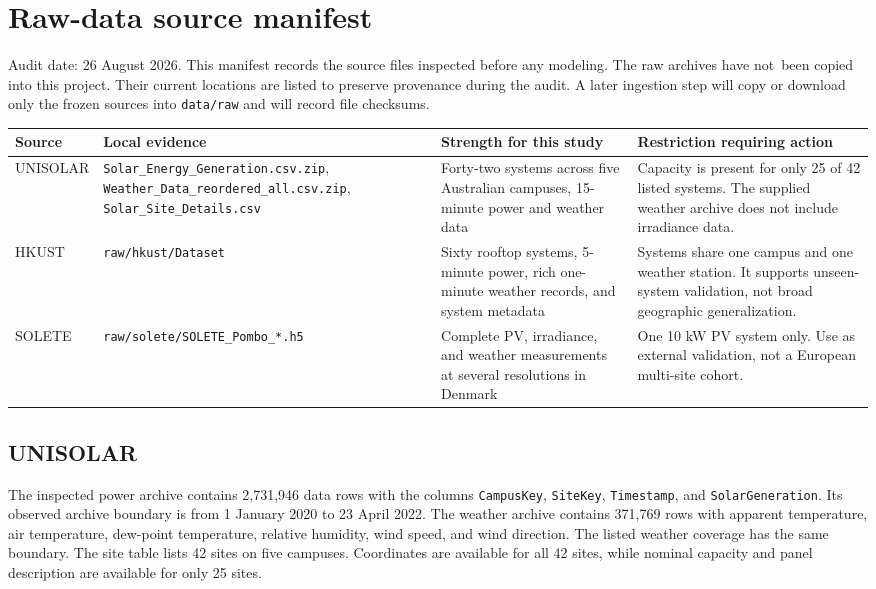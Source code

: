 \section*{Raw-data source manifest}

\noindent Audit date: 26 August 2026. This manifest records the source files inspected before any modeling. The raw archives have not\ been copied into this project. Their current locations are listed to preserve provenance during the audit. A later ingestion step will copy or download only the frozen sources into \texttt{data/raw} and will record file checksums.

\begin{center}
\begin{tabular}{p{}p{}p{}p{}}
\hline
Source & Local evidence & Strength for this study & Restriction requiring action \\
\hline
UNISOLAR & \texttt{Solar\_Energy\_Generation.csv.zip}, \texttt{Weather\_Data\_reordered\_all.csv.zip}, \texttt{Solar\_Site\_Details.csv} & Forty-two systems across five Australian campuses, 15-minute power and weather data & Capacity is present for only 25 of 42 listed systems. The supplied weather archive does not include irradiance data. \\
HKUST & \texttt{raw/hkust/Dataset} & Sixty rooftop systems, 5-minute power, rich one-minute weather records, and system metadata & Systems share one campus and one weather station. It supports unseen-system validation, not broad geographic generalization. \\
SOLETE & \texttt{raw/solete/SOLETE\_Pombo\_*.h5} & Complete PV, irradiance, and weather measurements at several resolutions in Denmark & One 10 kW PV system only. Use as external validation, not a European multi-site cohort. \\
\hline
\end{tabular}
\end{center}

\subsection*{UNISOLAR}

The inspected power archive contains 2,731,946 data rows with the columns \texttt{CampusKey}, \texttt{SiteKey}, \texttt{Timestamp}, and \texttt{SolarGeneration}. Its observed archive boundary is from 1 January 2020 to 23 April 2022. The weather archive contains 371,769 rows with apparent temperature, air temperature, dew-point temperature, relative humidity, wind speed, and wind direction. The listed weather coverage has the same boundary. The site table lists 42 sites on five campuses. Coordinates are available for all 42 sites, while nominal capacity and panel description are available for only 25 sites.

